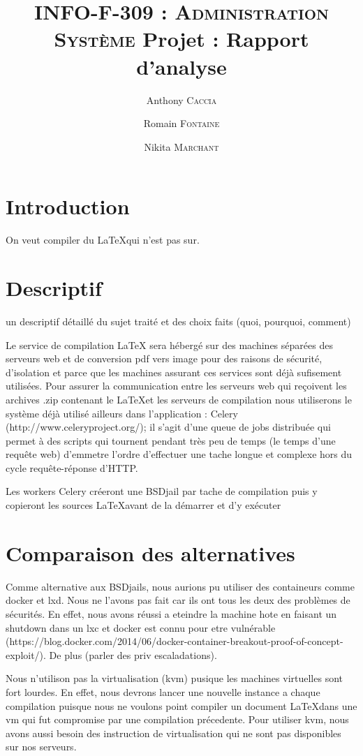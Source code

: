 \documentclass[10pt,a4paper]{article}
\author{Anthony \textsc{Caccia} \and Romain \textsc{Fontaine} \and Nikita \textsc{Marchant} }
\date{}
\title{\textsc{INFO-F-309 : Administration Système} Projet : Rapport d'analyse}
\begin{document}
\maketitle

\section{Introduction}
On veut compiler du \LaTeX qui n'est pas sur.

\section{Descriptif}

un descriptif détaillé du sujet traité et des choix faits (quoi, pourquoi, comment)

Le service de compilation LaTeX sera hébergé sur des machines séparées des serveurs web et de conversion pdf vers image pour des raisons de sécurité, d'isolation et parce que les machines assurant ces services sont déjà sufisement utilisées.
Pour assurer la communication entre les serveurs web qui reçoivent les archives .zip contenant le \LaTeX et les serveurs de compilation nous utiliserons le système déjà utilisé ailleurs dans l'application : Celery (http://www.celeryproject.org/); il s'agit d'une queue de jobs distribuée qui permet à des scripts qui tournent pendant très peu de temps (le temps d'une requête web) d'emmetre l'ordre d'effectuer une tache longue et complexe hors du cycle requête-réponse d'HTTP.

Les workers Celery créeront une BSDjail par tache de compilation puis y copieront les sources \LaTeX avant de la démarrer et d'y exécuter


\section{Comparaison des alternatives}
Comme alternative aux BSDjails, nous aurions pu utiliser des containeurs comme docker et lxd.
Nous ne l'avons pas fait car ils ont tous les deux des problèmes de sécurités. En effet, nous avons réussi a eteindre la machine hote en faisant un shutdown dans un lxc et docker est connu pour etre vulnérable (https://blog.docker.com/2014/06/docker-container-breakout-proof-of-concept-exploit/). De plus (parler des priv escaladations).

Nous n'utilison pas la virtualisation (kvm) pusique les machines virtuelles sont fort lourdes. En effet, nous devrons lancer une nouvelle instance a chaque compilation puisque nous ne voulons point compiler un document \LaTeX dans une vm qui fut compromise par une compilation précedente.
Pour utiliser kvm, nous avons aussi besoin des instruction de virtualisation qui ne sont pas disponibles sur nos serveurs.
\end{document}
